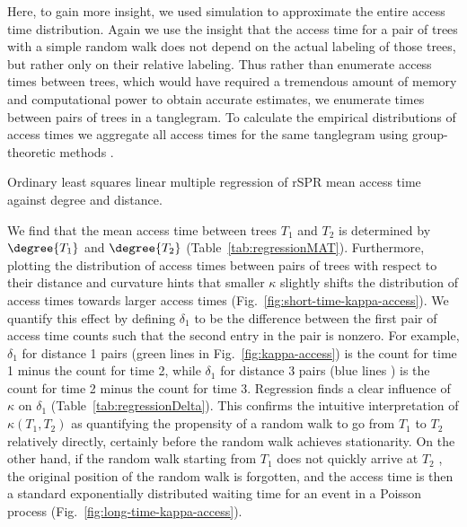 \documentclass[11pt,onecolumn,conference]{IEEEtran}
\let\MYoriglatexcaption\caption
\renewcommand{\caption}[2][\relax]{\MYoriglatexcaption[#2]{#2}}
\newcommand{\cuttable}[2][]{%
    \ifthenelse{\equal{#1}{}}%
		{}%
		{#1}%
}
\begin{document}
Here, to gain more insight, we used simulation to approximate the entire access time distribution.
Again we use the insight that the access time for a pair of trees with a simple random walk does not depend on the actual labeling of those trees, but rather only on their relative labeling.
Thus rather than enumerate access times between trees, which would have required a tremendous amount of memory and computational power to obtain accurate estimates, we enumerate times between pairs of trees in a tanglegram.
To calculate the empirical distributions of access times we aggregate all access times for the same tanglegram using \cuttable{our }group-theoretic methods \cite{tangle}.

\begin{table}
\centering
\caption{Ordinary least squares linear multiple regression of rSPR mean access time against degree and distance.}
\label{tab:regressionMAT}
\end{table}

We find that the mean access time between trees $T_1$ and $T_2$ is determined by $\degree{T_1}$ and $\degree{T_2}$ (Table~\ref{tab:regressionMAT}).
Furthermore, plotting the distribution of access times between pairs of trees with respect to their distance and curvature hints that smaller $\kappa$ slightly shifts the distribution of access times towards larger access times (Fig.~\ref{fig:short-time-kappa-access}).
We quantify this effect by defining $\delta_1$ to be the difference between the first pair of access time counts such that the second entry in the pair is nonzero.
For example, $\delta_1$ for distance 1 pairs (green lines in Fig.~\ref{fig:kappa-access}) is the count for time 1 minus the count for time 2, while $\delta_1$ for distance 3 pairs (blue lines\cuttable{ in Fig.~\ref{fig:kappa-access}}) is the count for time 2 minus the count for time 3.
Regression finds a clear influence of $\kappa$ on $\delta_1$ (Table~\ref{tab:regressionDelta}).
This confirms the intuitive interpretation of $\kappa(T_1, T_2)$ as quantifying the propensity of a random walk to go from $T_1$ to $T_2$ relatively directly, certainly before the random walk achieves stationarity.
On the other hand, if the random walk starting from $T_1$ does not quickly arrive at $T_2$\cuttable{ and instead achieves stationarity}, the original position of the random walk is forgotten, and the access time is then a standard exponentially distributed waiting time for an event in a Poisson process (Fig.~\ref{fig:long-time-kappa-access}).
\end{document}
